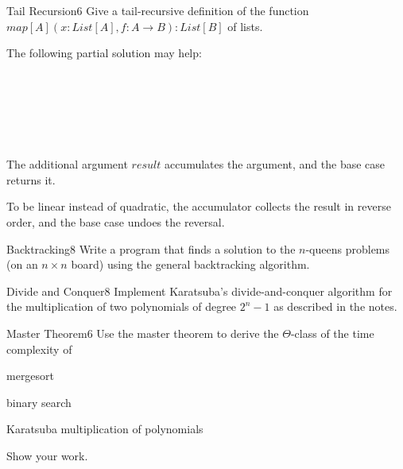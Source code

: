 \documentclass[a4paper]{article}
\begin{document}
\header

\begin{problem}{Tail Recursion}{6}
Give a tail-recursive definition of the function $map[A](x:List[A],f:A\to B):List[B]$ of lists.

The following partial solution may help:
\begin{acode}
\\
\\
\end{acode}


\begin{solution}
\begin{acode}
\\
\\
\end{acode}

The additional argument $result$ accumulates the argument, and the base case returns it.

To be linear instead of quadratic, the accumulator collects the result in reverse order, and the base case undoes the reversal.
\end{solution}
\end{problem}

\begin{problem}{Backtracking}{8}
Write a program that finds a solution to the $n$-queens problems (on an $n\times n$ board) using the general backtracking algorithm.
\end{problem}

\begin{problem}{Divide and Conquer}{8}
Implement Karatsuba's divide-and-conquer algorithm for the multiplication of two polynomials of degree $2^n-1$ as described in the notes.
\end{problem}

\begin{problem}{Master Theorem}{6}
Use the master theorem to derive the $\Theta$-class of the time complexity of
\begin{compactenum}
  \item mergesort
  \item binary search
  \item Karatsuba multiplication of polynomials
\end{compactenum}
Show your work.
\end{problem}
\end{document}
